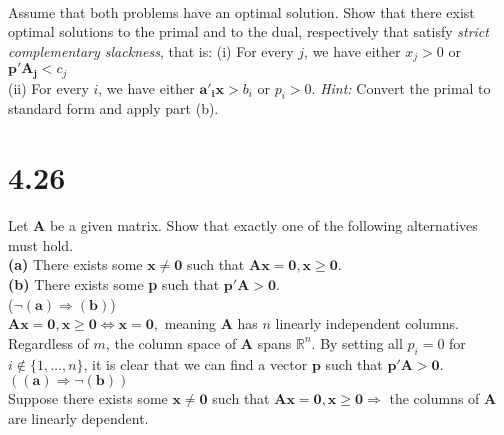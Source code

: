 \documentclass{article}
\begin{document}
\noindent \\
Assume that both problems have an optimal solution.  Show that there exist optimal solutions to the primal and to the dual, respectively that satisfy \emph{strict complementary slackness}, that is:
(i) For every $j$, we have either $x_j > 0$ or $\mathbf{p'A_j} < c_j$ \\
(ii) For every $i$, we have either $\mathbf{a'_i x} > b_i$ or $p_i > 0$.  \emph{Hint:} Convert the primal to standard form and apply part (b). \\

\section*{4.26} 
Let $\mathbf{A}$ be a given matrix.  Show that exactly one of the following alternatives must hold.\\

\noindent
\textbf{(a)} There exists some $\mathbf{x \neq 0}$ such that $\mathbf{Ax = 0, x \geq 0}$.\\
\textbf{(b)} There exists some \textbf{p} such that $\mathbf{p'A > 0}$. \\

\noindent
($\mathbf{\neg (a) \Rightarrow (b)}$) \\
\noindent
$\mathbf{Ax = 0, x \geq 0} \Leftrightarrow \mathbf{x = 0},$  meaning $\mathbf{A}$ has $n$ linearly independent columns.  Regardless of $m$, the column space of $\mathbf{A}$ spans $\mathbb{R}^n$.  By setting all $p_i = 0$ for $i \notin \{1, \dots, n\}$, it is clear that we can find a vector $\mathbf{p}$ such that $\mathbf{p'A > 0}$. \\

\noindent
$(\mathbf{(a) \Rightarrow \neg (b)})$ \\
Suppose there exists some $\mathbf{x \neq 0}$ such that $\mathbf{Ax = 0, x \geq 0} \Rightarrow $  the columns of $\mathbf{A}$ are linearly dependent.
\end{document}
